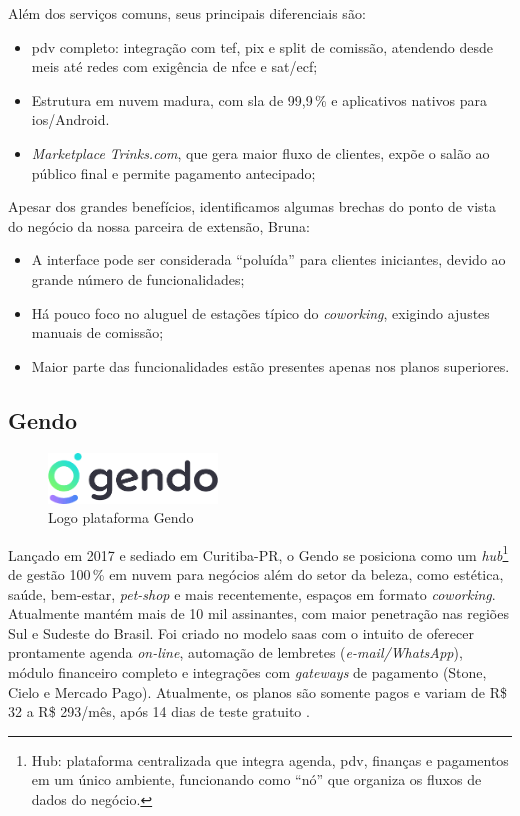 Além dos serviços comuns, seus principais diferenciais são:

\begin{itemize}
	\item \gls{pdv} completo: integração com \gls{tef}, \gls{pix} e split de comissão, atendendo desde \gls{mei}s até redes com exigência de \gls{nfce} e \gls{sat}/\gls{ecf};
	\item Estrutura em nuvem madura, com \gls{sla} de 99,9\,\% e aplicativos nativos para \gls{ios}/Android.
	\item \emph{Marketplace} \textit{Trinks.com}, que gera maior fluxo de clientes, expõe o salão ao
	público final e permite pagamento antecipado;
\end{itemize}

Apesar dos grandes benefícios, identificamos algumas brechas do ponto de vista do negócio da nossa
parceira de extensão, Bruna:

\begin{itemize}
	\item A interface pode ser considerada “poluída” para clientes iniciantes, devido ao grande
	número de funcionalidades;
	\item Há pouco foco no aluguel de estações típico do \emph{coworking}, exigindo ajustes manuais de
	comissão;
	\item Maior parte das funcionalidades estão presentes apenas nos planos superiores.
\end{itemize}

\subsection{Gendo}

\begin{figure}[htb]
	\centering
	\includegraphics[width=0.4\textwidth]{cap01-Introducao/Images/1.4.2_Gendo}
	\caption{Logo plataforma Gendo}
	\label{fig:Gendo}
\end{figure}

 \FloatBarrier

Lançado em 2017 e sediado em Curitiba-PR, o Gendo se posiciona como um \emph{hub}\footnote{Hub: plataforma centralizada que integra agenda, \gls{pdv}, finanças e pagamentos em um único ambiente, funcionando como “nó” que organiza os fluxos de dados do negócio.} de gestão 100\,\% em nuvem para negócios além do setor da beleza, como estética, saúde, bem-estar, \emph{pet-shop} e mais recentemente, espaços em formato \emph{coworking}. 
Atualmente mantém mais de 10 mil assinantes, com maior penetração nas regiões Sul e Sudeste do Brasil. Foi criado no modelo \gls{saas} com o intuito de oferecer prontamente agenda \emph{on-line}, automação de lembretes (\emph{e-mail/WhatsApp}), módulo financeiro completo e integrações com \emph{gateways} de pagamento (Stone, Cielo e Mercado Pago). Atualmente, os planos são somente pagos e variam de R\$ 32 a R\$ 293/mês, após 14 dias de teste gratuito \cite{Gendo}.

